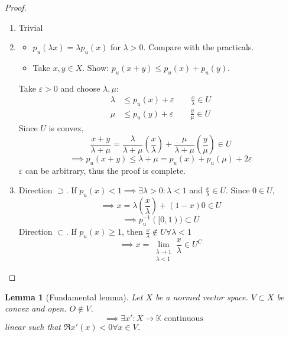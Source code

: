 \documentclass[a4paper]{article}
\newcounter{lecref}[section]
\numberwithin{lecref}{section}
\newtheorem{lemma}[lecref]{Lemma}
\begin{document}
\begin{proof}
	\begin{enumerate}
		\item Trivial
		\item
			\begin{itemize}
				\item $p_u(\lambda x) = \lambda p_u(x)$ for $\lambda > 0$. Compare with the practicals.
				\item Take $x, y \in X$. Show: $p_u(x + y) \leq p_u(x) + p_u(y)$.
			\end{itemize}
			Take $\varepsilon > 0$ and choose $\lambda, \mu$:
			\begin{align*}
				\lambda &\leq p_u(x) + \varepsilon  \qquad \frac x\lambda \in U \\
				\mu &\leq p_u(y) + \varepsilon  \qquad \frac y\mu \in U
			\end{align*}
			Since $U$ is convex,
			\[ \frac{x + y}{\lambda + \mu} = \frac\lambda{\lambda + \mu} \left(\frac x\lambda\right) + \frac\mu{\lambda + \mu} \left(\frac y\mu\right) \in U \]
			\[ \implies p_u(x + y) \leq \lambda + \mu = p_u(x) + p_u(\mu) + 2\varepsilon \]
			$\varepsilon$ can be arbitrary, thus the proof is complete.
		\item Direction $\supset$. If $p_u(x) < 1 \implies \exists \lambda > 0: \lambda < 1$ and $\frac x\lambda \in U$. Since $0 \in U$,
			\[ \implies x = \lambda \left(\frac x\lambda\right) + (1 - x) 0 \in U \]
			\[ \implies p_u^{-1}([0, 1)) \subset U \]
			Direction $\subset$. If $p_u(x) \geq 1$, then $\frac x\lambda \not\in U \forall \lambda < 1$
			\[ \implies x = \lim_{\substack{\lambda \to 1 \\ \lambda < 1}} \frac{x}{\lambda} \in U^C \]
	\end{enumerate}
\end{proof}

\begin{lemma}[Fundamental lemma]
	\label{lemma:4.10}
	Let $X$ be a normed vector space. $V \subset X$ be convex and open. $O \not\in V$.
	\[ \implies \exists x': X \to \mathbb K \text{ continuous} \]
	linear such that $\Re{x'(x)} < 0 \forall x \in V$.
\end{lemma}
\end{document}
